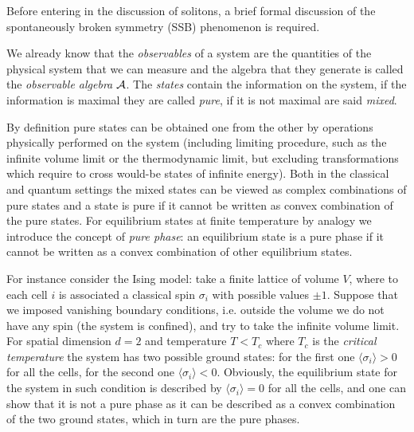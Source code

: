 \documentclass[../main/main.tex]{subfiles}
\begin{document}
Before entering in the discussion of solitons, a brief formal discussion of the spontaneously broken symmetry (SSB) phenomenon is required. 

We already know that the \emph{observables} of a system are the quantities of the physical system that we can measure and the algebra that they generate is called the \emph{observable algebra} $\mathcal A$. The \emph{states} contain the information on the system, if the information is maximal they are called \emph{pure}, if it is not maximal are said \emph{mixed}. 

By definition pure states can be obtained one from the other by operations physically performed on the system (including limiting procedure, such as the infinite volume limit or the thermodynamic limit, but excluding transformations which require to cross would-be states of infinite energy). Both in the classical and quantum settings the mixed states can be viewed as complex combinations of pure states and a state is pure if it cannot be written as convex combination of the pure states. 
For equilibrium states at finite temperature by analogy we introduce the concept of \emph{pure phase}: an equilibrium state is a pure phase if it cannot be written as a convex combination of other equilibrium states.

\skipline

For instance consider the Ising model: take a finite lattice of volume $V$, where to each cell $i$ is associated a classical spin $\sigma_i$ with possible values $\pm1$. Suppose that we imposed vanishing boundary conditions, i.e. outside the volume we do not have any spin (the system is confined), and try to take the infinite volume limit. For spatial dimension $d=2$ and temperature $T<T_c$ where $T_c$ is the \emph{critical temperature} the system has two possible ground states: for the first one $\langle\sigma_i\rangle>0$ for all the cells, for the second one $\langle\sigma_i\rangle<0$. Obviously, the equilibrium state for the system in such condition is described by $\langle\sigma_i\rangle =0$ for all the cells, and one can show that it is not a pure phase as it can be described as a convex combination of the two ground states, which in turn are the pure phases. 

\skipline
\end{document}
